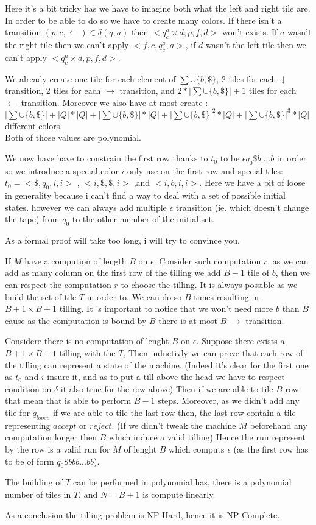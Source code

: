 Here it's a bit tricky has we have to imagine both what the left and right tile are.
In order to be able to do so we have to create many colors.
If there isn't a transition $(p,c,\leftarrow) \in \delta (q,a)$ then $<q_c^a\times d,p,f,d>$ won't exists. If $a$ wasn't the right tile then we can't apply $<f,c,q_c^a,a>$, if $d$ wasn't the left tile then we can't apply $<q_c^a\times d,p,f,d>$.

We already create one tile for each element of $\sum\cup \{b,\$\}$, 2 tiles for each $\downarrow$ transition, 2 tiles for each $\rightarrow$ transition, and $2 * |\sum\cup \{b,\$\}| + 1$ tiles for each $\leftarrow$ transition.
Moreover we also have at most create : $|\sum\cup \{b,\$\}| + |Q|*|Q| + |\sum\cup \{b,\$\}| * |Q| + |\sum\cup \{b,\$\}|^2 * |Q| + |\sum\cup \{b,\$\}|^3 * |Q|$ different colors.
\\Both of those values are polynomial.

We now have have to constrain the first row thanks to $t_0$ to be $\epsilon q_0 \$ b ....b$ in order so we introduce a special color $i$ only use on the first row and special tiles: $t_0 = <\$,q_0,i,i>$ , $<i,\$,\$,i>$ ,and $<i,b,i,i>$.
Here we have a bit of loose in generality because i can't find a way to deal with a set of possible initial states. however we can always add multiple $\epsilon$ transition (ie. which doesn't change the tape) from  $q_0$ to the other member of the initial set. 


As a formal proof will take too long, i will try to convince you.


If $M$ have a compution of length $B$ on  $\epsilon$.
Consider such computation $r$, as we can add as many column on the first row of the tilling we add $B-1$ tile of $b$, then we can respect the computation $r$ to choose the tilling. It is always possible as we build the set of tile $T$ in order to. We can do so $B$ times resulting in $B+1 \times B+1$ tilling. It 's important to notice that we won't need more $b$ than $B$ cause as the computation is bound by $B$ there is at most $B$ $\rightarrow$ transition.

Considere there is no computation of lenght $B$ on $\epsilon$.
Suppose there exists a $B+1 \times B+1$ tilling with the $T$,
Then inductivly we can prove that each row of the tilling can represent a state of the machine. (Indeed it's clear for the first one as $t_0$ and $i$ insure it, and as to put a till above the head we have to respect condition on $\delta$ it also true for the row above)
Then if we are able to tile $B$ row that mean that is able to perform $B-1$ steps.
Moreover, as we didn't add any tile for $q_{loose}$ if we are able to tile the last row then, the last row contain a tile representing $accept$ or $reject$.
(If we didn't tweak the machine $M$ beforehand any computation longer then $B$ which induce a valid tilling)
Hence the run represent by the row is a valid run for $M$ of lenght $B$ which computs $\epsilon$ (as the first row has to be of form $q_0\$bbb...bb$).

The building of $T$ can be performed in polynomial has, there is a polynomial number of tiles in $T$, and $N=B+1$ is compute linearly.

As a conclusion the tilling problem is NP-Hard, hence it is NP-Complete.